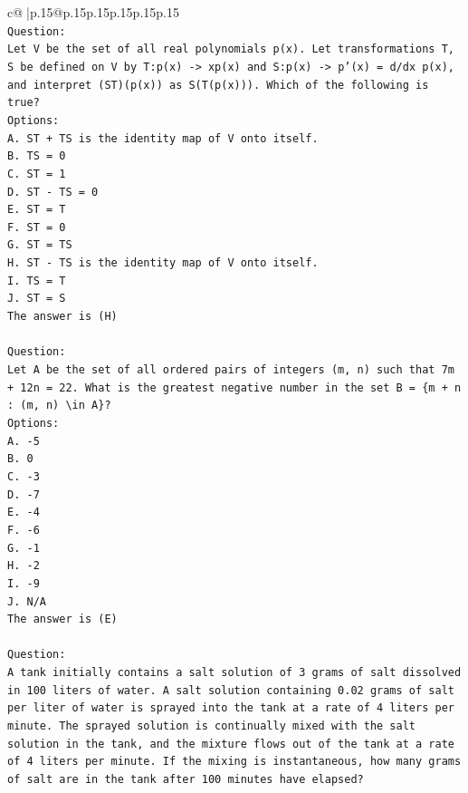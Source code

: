 \documentclass{article}
\begin{document}
{\begin{supertabular}{c@{$\;$}|p{.15\linewidth}@{}p{.15\linewidth}p{.15\linewidth}p{.15\linewidth}p{.15\linewidth}p{.15\linewidth}}
{{{\\ 
\texttt{Question:} \\
\texttt{Let V be the set of all real polynomials p(x). Let transformations T, S be defined on V by T:p(x) {-}> xp(x) and S:p(x) {-}> p'(x) = d/dx p(x), and interpret (ST)(p(x)) as S(T(p(x))). Which of the following is true?} \\
\texttt{Options:} \\
\texttt{A. ST + TS is the identity map of V onto itself.} \\
\texttt{B. TS = 0} \\
\texttt{C. ST = 1} \\
\texttt{D. ST {-} TS = 0} \\
\texttt{E. ST = T} \\
\texttt{F. ST = 0} \\
\texttt{G. ST = TS} \\
\texttt{H. ST {-} TS is the identity map of V onto itself.} \\
\texttt{I. TS = T} \\
\texttt{J. ST = S} \\
\texttt{The answer is (H)} \\
\\ 
\texttt{Question:} \\
\texttt{Let A be the set of all ordered pairs of integers (m, n) such that 7m + 12n = 22. What is the greatest negative number in the set B = \{m + n : (m, n) \textbackslash{}in A\}?} \\
\texttt{Options:} \\
\texttt{A. {-}5} \\
\texttt{B. 0} \\
\texttt{C. {-}3} \\
\texttt{D. {-}7} \\
\texttt{E. {-}4} \\
\texttt{F. {-}6} \\
\texttt{G. {-}1} \\
\texttt{H. {-}2} \\
\texttt{I. {-}9} \\
\texttt{J. N/A} \\
\texttt{The answer is (E)} \\
\\ 
\texttt{Question:} \\
\texttt{A tank initially contains a salt solution of 3 grams of salt dissolved in 100 liters of water. A salt solution containing 0.02 grams of salt per liter of water is sprayed into the tank at a rate of 4 liters per minute. The sprayed solution is continually mixed with the salt solution in the tank, and the mixture flows out of the tank at a rate of 4 liters per minute. If the mixing is instantaneous, how many grams of salt are in the tank after 100 minutes have elapsed?} \\
}}}
\end{supertabular}}
\end{document}
